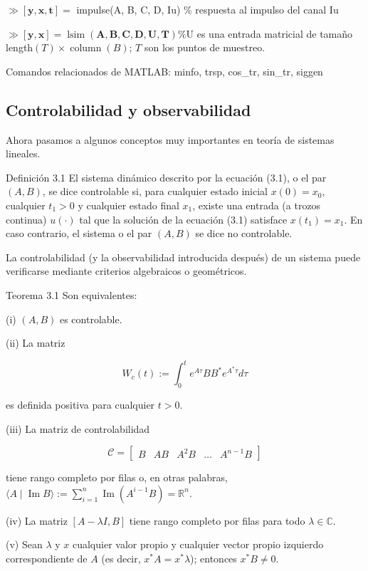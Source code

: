 \documentclass[11pt]{article}
\begin{document}
$\gg[\mathbf{y}, \mathbf{x}, \mathbf{t}]=$ impulse(A, B, C, D, Iu) \% respuesta al impulso del canal Iu

$\gg[\mathbf{y}, \mathbf{x}]=\operatorname{lsim}(\mathbf{A}, \mathbf{B}, \mathbf{C}, \mathbf{D}, \mathbf{U}, \mathbf{T}) \% \mathrm{U}$ es una entrada matricial de tamaño length$(T) \times \operatorname{column}(B)$; $T$ son los puntos de muestreo.

Comandos relacionados de MATLAB: minfo, trsp, cos\_tr, sin\_tr, siggen

\subsection*{Controlabilidad y observabilidad}
Ahora pasamos a algunos conceptos muy importantes en teoría de sistemas lineales.

Definición 3.1 El sistema dinámico descrito por la ecuación (3.1), o el par $(A, B)$, se dice controlable si, para cualquier estado inicial $x(0)=x_{0}$, cualquier $t_{1}>0$ y cualquier estado final $x_{1}$, existe una entrada (a trozos continua) $u(\cdot)$ tal que la solución de la ecuación (3.1) satisface $x\left(t_{1}\right)=x_{1}$. En caso contrario, el sistema o el par $(A, B)$ se dice no controlable.

La controlabilidad (y la observabilidad introducida después) de un sistema puede verificarse mediante criterios algebraicos o geométricos.

Teorema 3.1 Son equivalentes:

(i) $(A, B)$ es controlable.

(ii) La matriz

$$
W_{c}(t):=\int_{0}^{t} e^{A \tau} B B^{*} e^{A^{*} \tau} d \tau
$$

es definida positiva para cualquier $t>0$.

(iii) La matriz de controlabilidad

$$
\mathcal{C}=\left[\begin{array}{lllll}
B & A B & A^{2} B & \ldots & A^{n-1} B
\end{array}\right]
$$

tiene rango completo por filas o, en otras palabras, $\langle A \mid \operatorname{Im} B\rangle:=\sum_{i=1}^{n} \operatorname{Im}\left(A^{i-1} B\right)=\mathbb{R}^{n}$.

(iv) La matriz $[A-\lambda I, B]$ tiene rango completo por filas para todo $\lambda \in \mathbb{C}$.

(v) Sean $\lambda$ y $x$ cualquier valor propio y cualquier vector propio izquierdo correspondiente de $A$ (es decir, $x^{*} A=x^{*} \lambda$); entonces $x^{*} B \neq 0$.
\end{document}

